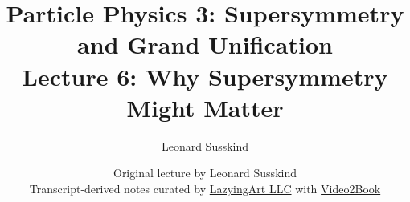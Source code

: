 \documentclass[11pt,oneside]{book}
\begin{document}
\frontmatter
\title{Particle Physics 3: Supersymmetry and Grand Unification\\[0.5em]
\large Lecture 6: Why Supersymmetry Might Matter}
\author{Leonard Susskind}
\date{Original lecture by Leonard Susskind\\[0.4em]
Transcript-derived notes curated by
\href{https://lazying.art}{LazyingArt LLC} with
\href{https://github.com/lachlanchen/Video2Book}{Video2Book}}
\maketitle
\mainmatter

\end{document}
